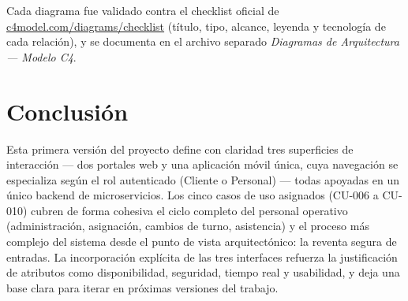 \documentclass[12pt,a4paper]{article}
\begin{document}
Cada diagrama fue validado contra el checklist oficial de
\href{https://c4model.com/diagrams/checklist}{c4model.com/diagrams/checklist} (título, tipo,
alcance, leyenda y tecnología de cada relación), y se documenta en el archivo separado
\textit{Diagramas de Arquitectura --- Modelo C4}.

\section{Conclusión}

Esta primera versión del proyecto define con claridad tres superficies de interacción --- dos
portales web y una aplicación móvil única, cuya navegación se especializa según el rol
autenticado (Cliente o Personal) --- todas apoyadas en un único backend de microservicios. Los
cinco casos de uso asignados (CU-006 a CU-010) cubren de forma cohesiva el ciclo completo del
personal operativo (administración, asignación, cambios de turno, asistencia) y el proceso más
complejo del sistema desde el punto de vista arquitectónico: la reventa segura de entradas. La
incorporación explícita de las tres interfaces refuerza la justificación de atributos como
disponibilidad, seguridad, tiempo real y usabilidad, y deja una base clara para iterar en
próximas versiones del trabajo.
\end{document}
